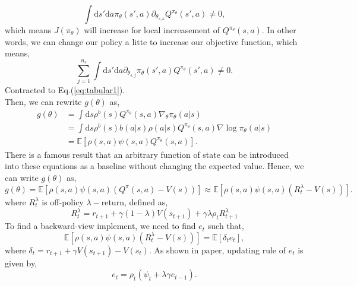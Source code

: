 \documentclass[11pt,a4paper]{article}
\def\d{{\mathrm d}}
\def\E{\mathbb{E}}
\begin{document}
\begin{equation}
\int \d s'\d a \pi_{\theta}(s',a)\partial_{\theta_{s,k}}Q^{\pi_{\theta}}(s',a) \neq 0,
\end{equation}
which means $J(\pi_{\theta})$ will increase for local increasement of $Q^{\pi_{\theta}}(s,a)$. In other words, we can change our policy a litte to increase our objective function, which means,
\begin{equation}
\sum_{j=1}^{n_s}\int \d s' \d a \partial_{\theta_{s,j}}\pi_{\theta}(s',a) Q^{\pi_{\theta}}(s',a) \neq 0.
\end{equation}
Contracted to Eq.(\ref{eq:tabular1}). \\ 
Then, we can rewrite $g(\theta)$ as,
\begin{align}
g(\theta) & = \int \d s \rho^b(s) Q^{\pi_{\theta}}(s,a)\nabla_{\theta}\pi_{\theta}(a|s) \\ 
& = \int \d s \rho^b(s)b(a|s)\rho(a|s)Q^{\pi_{\theta}}(s,a)\nabla \log \pi_{\theta}(a|s) \\ 
& = \E[\rho(s,a)\psi(s,a)Q^{\pi_{\theta}}(s,a)].
\end{align}
There is a famous result that an arbitrary function of state can be introduced into these equations as a baseline without changing the expected value. Hence, we can write $g(\theta)$ as,
\begin{equation}
g(\theta) = \E[\rho(s,a)\psi(s,a)(Q^{\pi}(s,a)-V(s))] \approx \E[\rho(s,a)\psi(s,a)(R_t^{\lambda}-V(s))].
\end{equation}
where $R_t^\lambda$ is off-policy $\lambda-$return, defined as,
\begin{equation}
R_t^\lambda = r_{t+1} + \gamma (1-\lambda)V(s_{t+1}) + \gamma \lambda \rho_t R_{t+1}^\lambda 
\end{equation}
To find a backward-view implement, we need to find $e_t$ such that,
\begin{equation}
\E[\rho(s,a)\psi(s,a)(R_t^{\lambda}-V(s))] = \E[\delta_t e_t],
\end{equation}
where $\delta_t = r_{t+1} + \gamma V(s_{t+1}) - V(s_t)$. As shown in paper, updating rule of $e_t$ is given by,
\begin{equation}
e_t = \rho_t(\psi_t+\lambda\gamma e_{t-1}).
\end{equation}
\end{document}
